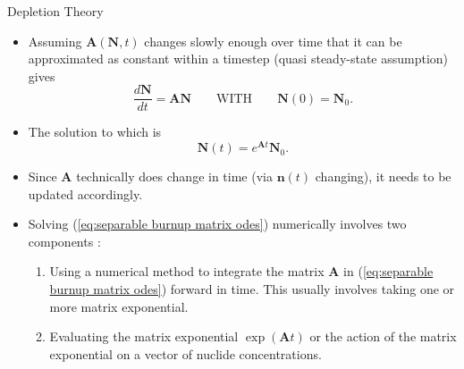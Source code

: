 \documentclass[9pt,t,aspectratio=169]{beamer}
\newcommand{\QWITH}{\qquad \text{WITH} \qquad}
\begin{document}
\begin{frame}{Depletion Theory}
    \begin{itemize}
        \item Assuming $\textbf{A}(\textbf{N},t)$ changes slowly enough over time that it can be approximated as constant within a timestep (quasi steady-state assumption) gives
        \begin{equation} \label{eq:separable burnup matrix odes}
            \frac{d\textbf{N}}{dt} =
            \textbf{A} \textbf{N}
            \QWITH
            \textbf{N}(0) = \textbf{N}_{0}.
        \end{equation}
        \item The solution to which is
        \begin{equation} \label{eq:separation solution}
            \textbf{N}(t) = e^{\textbf{A}t} \textbf{N}_{0}.
        \end{equation}
        \item Since \textbf{A} technically does change in time (via $\textbf{n}(t)$ changing), it needs to be updated accordingly.
        \vspace*{0.4cm}
        \item Solving (\ref{eq:separable burnup matrix odes}) numerically involves two components \cite{romano-depletion-2021}:
        \begin{enumerate}
            \item Using a numerical method to integrate the matrix $\textbf{A}$ in (\ref{eq:separable burnup matrix odes}) forward in time. This usually involves taking one or more matrix exponential.
            \item Evaluating the matrix exponential $\exp(\textbf{A}t)$ or the action of the matrix exponential on a vector of nuclide concentrations.
        \end{enumerate}
    \end{itemize}
\end{frame}
\end{document}
